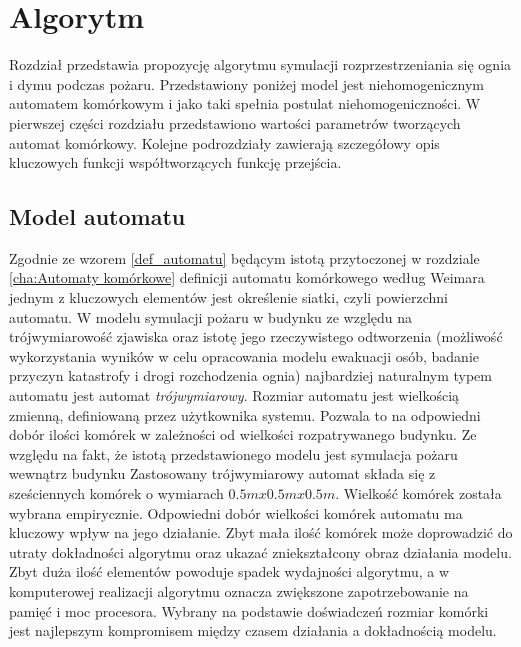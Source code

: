 ﻿%

\chapter{Algorytm}
\label{cha:Algorytm}
Rozdział przedstawia propozycję algorytmu symulacji rozprzestrzeniania się ognia i dymu podczas pożaru.
Przedstawiony poniżej model jest niehomogenicznym automatem komórkowym i jako taki spełnia postulat niehomogeniczności.
W pierwszej części rozdziału przedstawiono wartości parametrów tworzących automat komórkowy. Kolejne podrozdziały 
zawierają szczegółowy opis kluczowych funkcji współtworzących funkcję przejścia.
\section {Model automatu}
Zgodnie ze wzorem \ref{def_automatu} będącym istotą przytoczonej w rozdziale \ref{cha:Automaty komórkowe} definicji automatu komórkowego według Weimara jednym z kluczowych elementów jest określenie siatki, czyli powierzchni automatu. W modelu symulacji pożaru w budynku
ze względu na trójwymiarowość zjawiska oraz istotę jego rzeczywistego odtworzenia (możliwość wykorzystania wyników w celu
opracowania modelu ewakuacji osób, badanie przyczyn katastrofy i drogi rozchodzenia ognia) najbardziej naturalnym typem automatu 
jest automat \textsl {trójwymiarowy}. 
Rozmiar automatu jest wielkością zmienną, definiowaną przez użytkownika systemu. Pozwala to na odpowiedni dobór ilości komórek w zależności od wielkości rozpatrywanego budynku. Ze względu na fakt, że istotą przedstawionego modelu jest symulacja pożaru wewnątrz budynku 
Zastosowany trójwymiarowy automat składa się z sześciennych komórek o wymiarach $0.5m x 0.5m x 0.5m$. Wielkość komórek została wybrana empirycznie. 
Odpowiedni dobór wielkości komórek automatu ma kluczowy wpływ na jego działanie. Zbyt mała ilość komórek może doprowadzić do utraty
dokładności algorytmu oraz ukazać zniekształcony obraz działania modelu. Zbyt duża ilość elementów powoduje spadek wydajności algorytmu, a w komputerowej realizacji algorytmu oznacza zwiększone zapotrzebowanie na pamięć i moc procesora.
Wybrany na podstawie doświadczeń rozmiar komórki jest najlepszym
kompromisem między czasem działania a dokładnością modelu.
